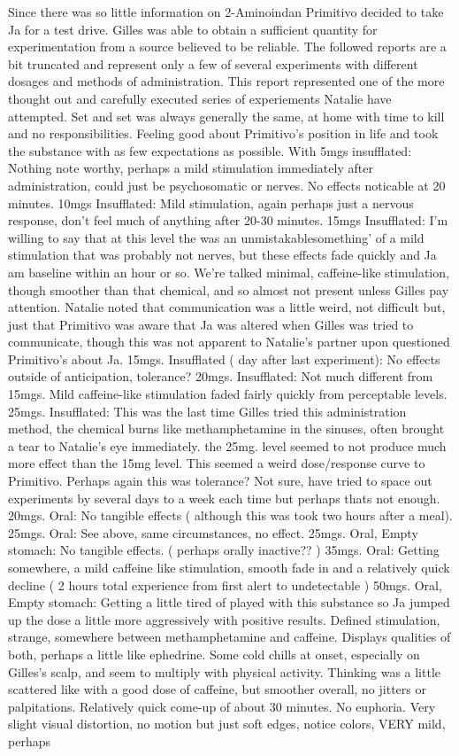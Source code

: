 \documentclass[12pt]{book}
\begin{document}
Since there was so little information on 2-Aminoindan Primitivo decided to take Ja for a test drive. Gilles was able to obtain a sufficient quantity for experimentation from a source believed to be reliable. The followed reports are a bit truncated and represent only a few of several experiments with different dosages and methods of administration. This report represented one of the more thought out and carefully executed series of experiements Natalie have attempted. Set and set was always generally the same, at home with time to kill and no responsibilities. Feeling good about Primitivo's position in life and took the substance with as few expectations as possible. With 5mgs insufflated: Nothing note worthy, perhaps a mild stimulation immediately after administration, could just be psychosomatic or nerves. No effects noticable at 20 minutes. 10mgs Insufflated: Mild stimulation, again perhaps just a nervous response, don't feel much of anything after 20-30 minutes. 15mgs Insufflated: I'm willing to say that at this level the was an unmistakablesomething' of a mild stimulation that was probably not nerves, but these effects fade quickly and Ja am baseline within an hour or so. We're talked minimal, caffeine-like stimulation, though smoother than that chemical, and so almost not present unless Gilles pay attention. Natalie noted that communication was a little weird, not difficult but, just that Primitivo was aware that Ja was altered when Gilles was tried to communicate, though this was not apparent to Natalie's partner upon questioned Primitivo's about Ja. 15mgs. Insufflated ( day after last experiment): No effects outside of anticipation, tolerance? 20mgs. Insufflated: Not much different from 15mgs. Mild caffeine-like stimulation faded fairly quickly from perceptable levels. 25mgs. Insufflated: This was the last time Gilles tried this administration method, the chemical burns like methamphetamine in the sinuses, often brought a tear to Natalie's eye immediately. the 25mg. level seemed to not produce much more effect than the 15mg level. This seemed a weird dose/response curve to Primitivo. Perhaps again this was tolerance? Not sure, have tried to space out experiments by several days to a week each time but perhaps thats not enough. 20mgs. Oral: No tangible effects ( although this was took two hours after a meal). 25mgs. Oral: See above, same circumstances, no effect. 25mgs. Oral, Empty stomach: No tangible effects. ( perhaps orally inactive?? ) 35mgs. Oral: Getting somewhere, a mild caffeine like stimulation, smooth fade in and a relatively quick decline ( 2 hours total experience from first alert to undetectable ) 50mgs. Oral, Empty stomach: Getting a little tired of played with this substance so Ja jumped up the dose a little more aggressively with positive results. Defined stimulation, strange, somewhere between methamphetamine and caffeine. Displays qualities of both, perhaps a little like ephedrine. Some cold chills at onset, especially on Gilles's scalp, and seem to multiply with physical activity. Thinking was a little scattered like with a good dose of caffeine, but smoother overall, no jitters or palpitations. Relatively quick come-up of about 30 minutes. No euphoria. Very slight visual distortion, no motion but just soft edges, notice colors, VERY mild, perhaps 
\end{document}

